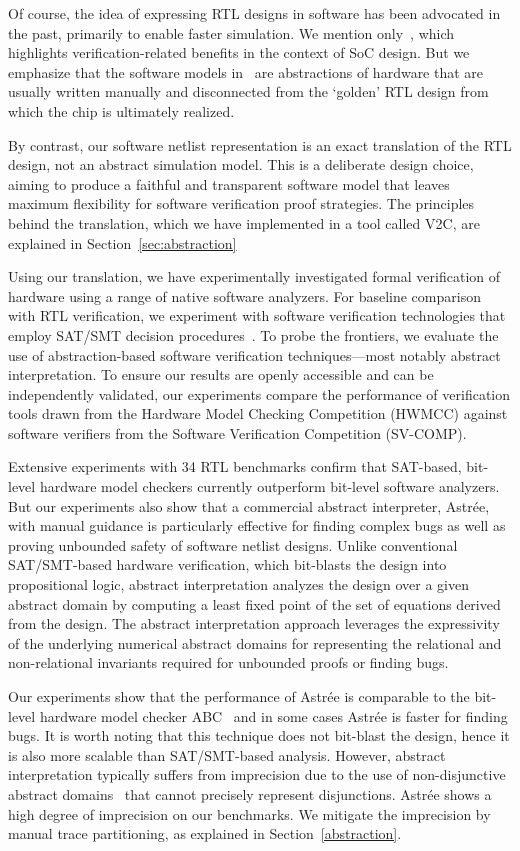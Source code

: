 Of course, the idea of expressing RTL designs in software has been
advocated in the past, primarily to enable faster simulation.  We mention
only~\cite{soc-keating}, which highlights verification-related benefits in
the context of SoC design.  But we emphasize that the software models
in~\cite{soc-keating} are abstractions of hardware that are usually written
manually and disconnected from the `golden' RTL design  from which the chip
is ultimately realized.

By contrast, our software netlist representation is an exact translation of
the RTL design, not an abstract simulation model.  This is a deliberate
design choice, aiming to produce a faithful and transparent software model
that leaves maximum flexibility for software verification proof strategies. 
The principles behind the translation, which we have implemented in a tool
called \textsc{V2C}, are explained in Section~\ref{sec:abstraction}

Using our translation, we have experimentally investigated formal
verification of hardware using a range of native software analyzers.  For
baseline comparison with RTL verification, we experiment with software
verification technologies that employ SAT/SMT decision
procedures~\cite{DBLP:conf/cav/BeyerK11,2ls,cbmc.tacas:2004,DBLP:conf/tacas/HeizmannDGLMSP16}. 
To probe the frontiers, we evaluate the use of abstraction-based software
verification techniques---most notably abstract interpretation.  To ensure
our results are openly accessible and can be independently validated, our
experiments compare the performance of verification tools drawn from the
Hardware Model Checking Competition (HWMCC) against software verifiers from
the Software Verification Competition (SV-COMP).

Extensive experiments with 34 RTL benchmarks confirm that SAT-based,
bit-level hardware model checkers currently outperform bit-level software
analyzers.  But our experiments also show that a commercial abstract
interpreter, Astr{\'e}e, with manual guidance is particularly effective for
finding complex bugs as well as proving unbounded safety of software netlist
designs.  Unlike conventional SAT/SMT-based hardware verification, which
bit-blasts the design into propositional logic,   abstract interpretation
analyzes the design over a given abstract domain by computing a least fixed
point of the set of equations derived from the design.  The abstract
interpretation approach leverages the expressivity of the underlying
numerical abstract domains for representing the relational and
non-relational invariants required for unbounded proofs or finding bugs.

Our experiments show that the performance of Astr{\'e}e is comparable to the
bit-level hardware model checker ABC~\cite{abc} and in some cases Astr{\'e}e
is faster for finding bugs.  It is worth noting that this technique does not
bit-blast the design, hence it is also more scalable than SAT/SMT-based
analysis.  However, abstract interpretation typically suffers from
imprecision due to the use of non-disjunctive abstract domains~\cite{nd}
that cannot precisely represent disjunctions.  Astr{\'e}e shows a high
degree of imprecision on our benchmarks.  We mitigate the imprecision by
manual trace partitioning, as explained in Section~\ref{abstraction}.
